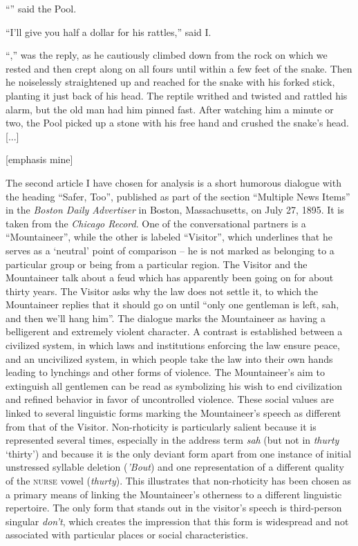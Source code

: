 \begin{ipquote}
“” said the Pool.

“I’ll give you half a dollar for his rattles,” said I.

{“,” was the reply, as he cautiously climbed down from the rock on which we rested and then crept along on all fours until within a few feet of the snake. Then he noiselessly straightened up and reached for the snake with his forked stick, planting it just back of his head. The reptile writhed and twisted and rattled his alarm, but the old man had him pinned fast. After watching him a minute or two, the Pool picked up a stone with his free hand and crushed the snake’s head. {[...]}

\raggedleft
{[emphasis mine]}\\}

\end{ipquote}

The second article I have chosen for analysis is a short humorous dialogue with the heading “Safer, Too”, published as part of the section “Multiple News Items” in the \emph{Boston Daily Advertiser} in Boston, Massachusetts, on July 27, 1895. It is taken from the \emph{Chicago Record}. One of the conversational partners is a “Mountaineer”, while the other is labeled “Visitor”, which underlines that he serves as a ‘neutral’ point of comparison – he is not marked as belonging to a particular group or being from a particular region. The Visitor and the Mountaineer talk about a feud which has apparently been going on for about thirty years. The Visitor asks why the law does not settle it, to which the Mountaineer replies that it should go on until “only one gentleman is left, sah, and then we’ll hang him”. The dialogue marks the Mountaineer as having a belligerent and extremely violent character. A contrast is established between a civilized system, in which laws and institutions enforcing the law ensure peace, and an uncivilized system, in which people take the law into their own hands leading to lynchings and other forms of violence. The Mountaineer’s aim to extinguish all gentlemen can be read as symbolizing his wish to end civilization and refined behavior in favor of uncontrolled violence. These social values are linked to several linguistic forms marking the Mountaineer’s speech as different from that of the Visitor. Non-rhoticity is particularly salient because it is represented several times, especially in the address term \emph{sah} (but not in \emph{thurty} ‘thirty’) and because it is the only deviant form apart from one instance of initial unstressed syllable deletion (\emph{’Bout}) and one representation of a different quality of the \textsc{nurse} vowel (\emph{thurty}). This illustrates that non-rhoticity has been chosen as a primary means of linking the Mountaineer’s otherness to a different linguistic repertoire. The only form that stands out in the visitor’s speech is third-person singular \emph{don’t}, which creates the impression that this form is widespread and not associated with particular places or social characteristics.

